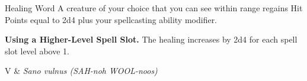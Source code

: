 \begin{Spell}[
  level=1st,
  time=1 Bonus Action,
  range=60 ft.,
  components={V},
  duration=Instantaneous,
  school=Abjuration,
  attack=None,
  effect=Healing
]{Healing Word}
A creature of your choice that you can see within range regains Hit Points equal to 2d4 plus your spellcasting ability modifier.

\textbf{Using a Higher-Level Spell Slot.} The healing increases by 2d4 for each spell slot level above 1.

\begin{components}
V & \textit{Sano vulnus (SAH-noh WOOL-noos)}
\end{components}
\end{Spell}


